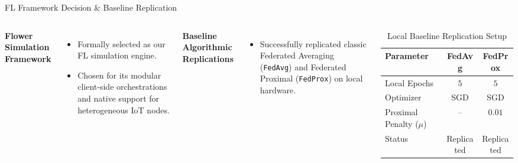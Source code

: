\documentclass[10pt, aspectratio=169]{beamer}
\begin{document}
\begin{frame}[fragile]{FL Framework Decision \& Baseline Replication}
    \begin{columns}[T]
        \textbf{Flower Simulation Framework}
        \begin{itemize}
            \item Formally selected  as our FL simulation engine.
            \item Chosen for its modular client-side orchestrations and native support for heterogeneous IoT nodes.
        \end{itemize}

        \vspace{0.2cm}
        \textbf{Baseline Algorithmic Replications}
        \begin{itemize}
            \item Successfully replicated classic Federated Averaging (\texttt{FedAvg}) and Federated Proximal (\texttt{FedProx}) on local hardware.
        \end{itemize}

        \centering
        \begin{table}
            \centering
            \caption{Local Baseline Replication Setup}
            \begin{tabular}{lcc}
                \toprule
                \textbf{Parameter} & \textbf{FedAvg} & \textbf{FedProx} \\
                \midrule
                Local Epochs & $5$ & $5$ \\
                Optimizer & SGD & SGD \\
                Proximal Penalty ($\mu$) & -- & $0.01$ \\
                Status & Replicated & Replicated \\
                \bottomrule
            \end{tabular}
        \end{table}
    \end{columns}
\end{frame}
\end{document}
